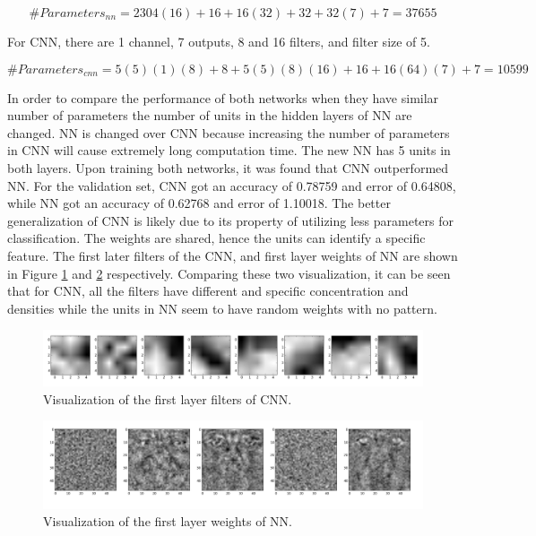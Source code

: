 \documentclass[12pt]{article}
\begin{document}
\begin{equation}\label{res}
\#Parameters_{nn} = 2304(16)+16+16(32)+32+32(7)+7 = 37655
\end{equation}

For CNN, there are 1 channel, 7 outputs, 8 and 16 filters, and filter size of 5.

\begin{equation}\label{res}
\#Parameters_{cnn} = 5(5)(1)(8)+8+5(5)(8)(16)+16+16(64)(7)+7 = 10599
\end{equation}

In order to compare the performance of both networks when they have similar number of parameters the number of units in the hidden layers of NN are changed. NN is changed over CNN because increasing the number of parameters in CNN will cause extremely long computation time. The new NN has 5 units in both layers. Upon training both networks, it was found that CNN outperformed NN. For the validation set, CNN got an accuracy of 0.78759 and error of 0.64808, while NN got an accuracy of 0.62768 and error of 1.10018. The better generalization of CNN is likely due to its property of utilizing less parameters for classification. The weights are shared, hence the units can identify a specific feature. The first later filters of the CNN, and first layer weights of NN are shown in Figure \ref{f34a} and \ref{f34b} respectively. Comparing these two visualization, it can be seen that for CNN, all the filters have different and specific concentration and densities while the units in NN seem to have random weights with no pattern. 

\begin{figure}[!htb]
\centering
\includegraphics[width=0.6\linewidth]{34/cnnVis.jpg}
\vspace{-0.1in}
\caption{Visualization of the first layer filters of CNN.}
\label{f34a}
\vspace{-0.1in}
\end{figure}

\begin{figure}[!htb]
\centering
\includegraphics[width=0.6\linewidth]{34/nnVis.jpg}
\vspace{-0.1in}
\caption{Visualization of the first layer weights of NN.}
\label{f34b}
\vspace{-0.1in}
\end{figure}
\end{document}
